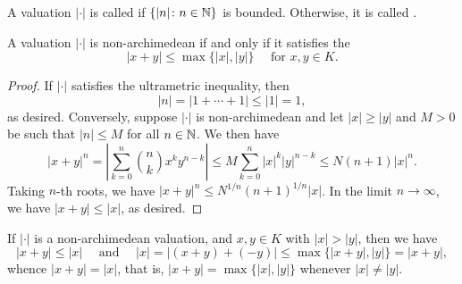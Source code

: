 \begin{definition}
    A valuation $|\cdot|$ is called  if $\{|n|\colon n\in\mathbb{N}\}$ is bounded. Otherwise, it is called .
\end{definition}

\begin{proposition}
    A valuation $|\cdot|$ is non-archimedean if and only if it satisfies the 
    \begin{equation*}
        |x + y|\le\max\{|x|, |y|\}\quad\text{ for }x,y\in K.
    \end{equation*}
\end{proposition}
\begin{proof}
    If $|\cdot|$ satisfies the ultrametric inequality, then 
    \begin{equation*}
        |n| = |1 + \cdots + 1|\le |1| = 1,
    \end{equation*}
    as desired. Conversely, suppose $|\cdot|$ is non-archimedean and let $|x|\ge |y|$ and $M > 0$ be such that $|n|\le M$ for all $n\in\mathbb{N}$. We then have 
    \begin{equation*}
        |x + y|^n = \left|\sum_{k = 0}^n\binom{n}{k}x^k y^{n - k}\right|\le M\sum_{k = 0}^n |x|^k |y|^{n - k}\le N(n + 1)|x|^n.
    \end{equation*}
    Taking $n$-th roots, we have $|x + y|^n\le N^{1/n}(n + 1)^{1/n}|x|$. In the limit $n\to\infty$, we have $|x + y|\le |x|$, as desired.
\end{proof}

\begin{remark}
    If $|\cdot|$ is a non-archimedean valuation, and $x,y\in K$ with $|x| > |y|$, then we have 
    \begin{equation*}
        |x + y|\le |x|\quad\text{ and }\quad |x| = |(x + y) + (-y)|\le\max\{|x + y|, |y|\} = |x + y|,
    \end{equation*}
    whence $|x + y| = |x|$, that is, $|x + y| = \max\{|x|, |y|\}$ whenever $|x|\ne |y|$.
\end{remark}

